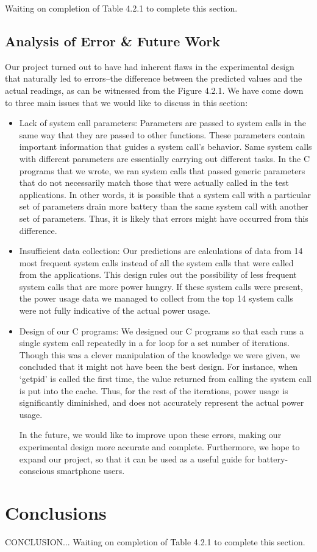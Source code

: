 \documentclass[11pt]{article}
\begin{document}
Waiting on completion of Table 4.2.1 to complete this section. 

\subsection{Analysis of Error \& Future Work}
Our project turned out to have had inherent flaws in the experimental design that naturally led to errors--the difference between the predicted 
values and the actual readings, as can be witnessed from the Figure 4.2.1. We have come down to three main issues that we would like to discuss 
in this section:

\begin{itemize}
  \item Lack of system call parameters: Parameters are passed to system calls in the same way that they are passed to other functions. 
  These parameters contain important information that guides a system call’s behavior. Same system calls with different parameters are essentially 
  carrying out different tasks. In the C programs that we wrote, we ran system calls that passed generic parameters that do not necessarily match 
  those that were actually called in the test applications. In other words, it is possible that a system call with a particular set of parameters 
  drain more battery than the same system call with another set of parameters. Thus, it is likely that errors might have occurred from this difference. 
  \item Insufficient data collection: Our predictions are calculations of data from 14 most frequent system calls instead of all the system calls 
  that were called from the applications. This design rules out the possibility of less frequent system calls that are more power hungry. If these 
  system calls were present, the power usage data we managed to collect from the top 14 system calls were not fully indicative of the actual power usage. 
  \item Design of our C programs: We designed our C programs so that each runs a single system call repeatedly in a for loop for a set number of iterations. 
  Though this was a clever manipulation of the knowledge we were given, we concluded that it might not have been the best design. For instance, when `getpid’ 
  is called the first time, the value returned from calling the system call is put into the cache. Thus, for the rest of the iterations, power usage is 
  significantly diminished, and does not accurately represent the actual power usage. 

In the future, we would like to improve upon these errors, making our experimental design more accurate and complete. Furthermore, we hope to expand our project, 
so that it can be used as a useful guide for battery-conscious smartphone users. 
\end{itemize}

\section{Conclusions}

CONCLUSION... Waiting on completion of Table 4.2.1 to complete this section.



\end{document}
